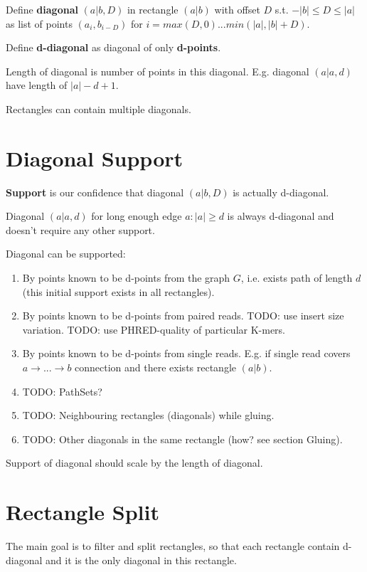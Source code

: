\documentclass[a4paper]{article}
\begin{document}
Define \textbf{diagonal} $(a|b, D)$ in rectangle $(a|b)$ with offset $D$ s.t. $-|b| \leq D \leq |a|$ as list of points $(a_i, b_{i-D})$ for $i = max(D, 0) ... min(|a|, |b|+D)$.

Define \textbf{d-diagonal} as diagonal of only \textbf{d-points}. 

Length of diagonal is number of points in this diagonal. E.g. diagonal $(a|a, d)$ have length of $|a| - d + 1$.

Rectangles can contain multiple diagonals.

\section{Diagonal Support}

\textbf{Support} is our confidence that diagonal $(a|b, D)$ is actually d-diagonal.

Diagonal $(a|a, d)$ for long enough edge $a: |a| \geq d$ is always d-diagonal and doesn't require any other support.

Diagonal can be supported:
\begin{enumerate}
\item By points known to be d-points from the graph $G$, i.e. exists path of length $d$ (this initial support exists in all rectangles).
\item By points known to be d-points from paired reads. TODO: use insert size variation. TODO: use PHRED-quality of particular K-mers.
\item By points known to be d-points from single reads. E.g. if single read covers $a \rightarrow ... \rightarrow b$ connection and there exists rectangle $(a|b)$.
\item TODO: PathSets?
\item TODO: Neighbouring rectangles (diagonals) while gluing.
\item TODO: Other diagonals in the same rectangle (how? see section Gluing).
\end{enumerate}

Support of diagonal should scale by the length of diagonal.

\section{Rectangle Split}

The main goal is to filter and split rectangles, so that each rectangle contain d-diagonal and it is the only diagonal in this rectangle.
\end{document}
